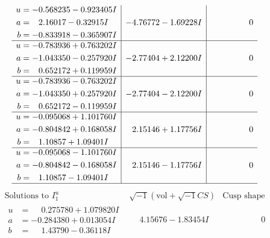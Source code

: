 \documentclass[1p]{elsarticle_modified}
\theoremstyle{definition}
\newcommand{\I}{\sqrt{-1}}
\begin{document}
$$\begin{array}{c|c|c}
\begin{aligned}
u &= -0.568235 - 0.923405 I \\
a &= \phantom{-}2.16017 - 0.32915 I \\
b &= -0.833918 - 0.365907 I\end{aligned}
 & -4.76772 - 1.69228 I & \phantom{-0.000000 } 0 \\ \hline\begin{aligned}
u &= -0.783936 + 0.763202 I \\
a &= -1.043350 - 0.257920 I \\
b &= \phantom{-}0.652172 + 0.119959 I\end{aligned}
 & -2.77404 + 2.12200 I & \phantom{-0.000000 } 0 \\ \hline\begin{aligned}
u &= -0.783936 - 0.763202 I \\
a &= -1.043350 + 0.257920 I \\
b &= \phantom{-}0.652172 - 0.119959 I\end{aligned}
 & -2.77404 - 2.12200 I & \phantom{-0.000000 } 0 \\ \hline\begin{aligned}
u &= -0.095068 + 1.101760 I \\
a &= -0.804842 + 0.168058 I \\
b &= \phantom{-}1.10857 + 1.09401 I\end{aligned}
 & \phantom{-}2.15146 + 1.17756 I & \phantom{-0.000000 } 0 \\ \hline\begin{aligned}
u &= -0.095068 - 1.101760 I \\
a &= -0.804842 - 0.168058 I \\
b &= \phantom{-}1.10857 - 1.09401 I\end{aligned}
 & \phantom{-}2.15146 - 1.17756 I & \phantom{-0.000000 } 0\\
 \hline 
 \end{array}$$\newpage$$\begin{array}{c|c|c}  
\text{Solutions to }I^u_{1}& \I (\text{vol} + \sqrt{-1}CS) & \text{Cusp shape}\\
 \hline 
\begin{aligned}
u &= \phantom{-}0.275780 + 1.079820 I \\
a &= -0.284380 + 0.013054 I \\
b &= \phantom{-}1.43790 - 0.36118 I\end{aligned}
 & \phantom{-}4.15676 - 1.83454 I & \phantom{-0.000000 } 0 \\ \hline\begin{aligned}

\end{aligned}
\end{array}$$
\end{document}
